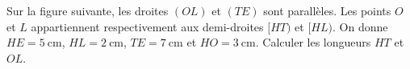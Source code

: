 
\begin{exercice}\label{exo2smath-0010}

    Sur la figure suivante, les droites $(OL)$ et $(TE)$ sont parallèles. Les points $O$ et $L$ appartiennent respectivement aux demi-droites $[HT)$ et $[HL)$. On donne $HE =\SI{5}{\centi\meter}$, $HL = \SI{2}{\centi\meter}$, $TE=\SI{7}{\centi\meter}$ et $HO=\SI{3}{\centi\meter}$. Calculer les longueurs $HT$ et $OL$.


\begin{center}
   
\end{center}


\end{exercice}
